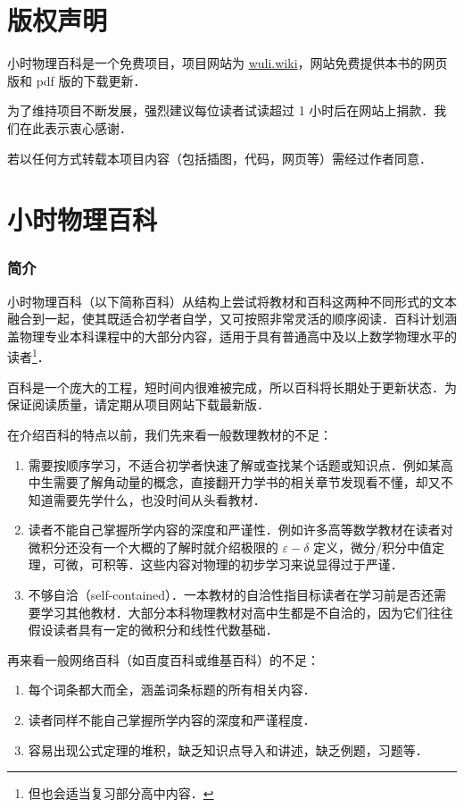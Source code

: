 
\chapter*{版权声明}

小时物理百科是一个免费项目，项目网站为 \href{http://wuli.wiki}{wuli.wiki}，网站免费提供本书的网页版和 pdf 版的下载更新．

为了维持项目不断发展，强烈建议每位读者试读超过 1 小时后在网站上捐款．我们在此表示衷心感谢．

若以任何方式转载本项目内容（包括插图，代码，网页等）需经过作者同意．

\chapter*{小时物理百科}

\subsection{简介}

小时物理百科（以下简称百科）从结构上尝试将教材和百科这两种不同形式的文本融合到一起，使其既适合初学者自学，又可按照非常灵活的顺序阅读．百科计划涵盖物理专业本科课程中的大部分内容，适用于具有普通高中及以上数学物理水平的读者\footnote{但也会适当复习部分高中内容．}．

百科是一个庞大的工程，短时间内很难被完成，所以百科将长期处于更新状态．为保证阅读质量，请定期从项目网站下载最新版．

在介绍百科的特点以前，我们先来看一般数理教材的不足：
\begin{enumerate}
\item 需要按顺序学习，不适合初学者快速了解或查找某个话题或知识点．例如某高中生需要了解角动量的概念，直接翻开力学书的相关章节发现看不懂，却又不知道需要先学什么，也没时间从头看教材．
\item 读者不能自己掌握所学内容的深度和严谨性．例如许多高等数学教材在读者对微积分还没有一个大概的了解时就介绍极限的 $\varepsilon-\delta$ 定义，微分/积分中值定理，可微，可积等．这些内容对物理的初步学习来说显得过于严谨．
\item 不够自洽（self-contained）．一本教材的自洽性指目标读者在学习前是否还需要学习其他教材．大部分本科物理教材对高中生都是不自洽的，因为它们往往假设读者具有一定的微积分和线性代数基础．
\end{enumerate}

再来看一般网络百科（如百度百科或维基百科）的不足：
\begin{enumerate}
\item 每个词条都大而全，涵盖词条标题的所有相关内容．
\item 读者同样不能自己掌握所学内容的深度和严谨程度．
\item 容易出现公式定理的堆积，缺乏知识点导入和讲述，缺乏例题，习题等．
\end{enumerate}

